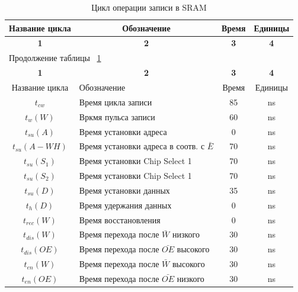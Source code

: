 \begin{center}
\begin{longtable}{|c|p{7cm}|c|c|}
\caption{Цикл операции записи в SRAM} \label{tab:sram_write_cycle} \\ \hline
\multicolumn{1}{|p{3cm}|}{\textbf{Название цикла}}    &   \multicolumn{1}{c|}{\textbf{Обозначение}} & 
\multicolumn{1}{|c|}{\textbf{Время}}    &   \multicolumn{1}{c|}{\textbf{Единицы}} \\ \hline

\multicolumn{1}{|c|}{\textbf{1}}    &   \multicolumn{1}{|c|}{\textbf{2}} &
\multicolumn{1}{|c|}{\textbf{3}}    &   \multicolumn{1}{|c|}{\textbf{4}} \\ \hline
\endfirsthead

\multicolumn{4}{l}{{Продолжение таблицы ~\ref{tab:sram_write_cycle}}} \\ %
\hline
\multicolumn{1}{|c|}{\textbf{1}}    &   \multicolumn{1}{|c|}{\textbf{2}} &
\multicolumn{1}{|c|}{\textbf{3}}    &   \multicolumn{1}{|c|}{\textbf{4}} \\ \hline
\endhead
\endfoot

	\hline
		Название цикла & Обозначение & Время & Единицы \\
	\hline
		${t_{cw}}$ & Время цикла записи & 85 & ns \\
	\hline
		${t_w(W)}$ & Вркмя пульса записи & 60 & ns \\
	\hline
		${t_{su}(A)}$ & Время установки адреса & 0 & ns \\
	\hline
		${t_{su}(A-WH)}$ & Время установки адреса в соотв. с $\bar{E}$ & 70 & ns \\
	\hline
		${t_{su}(S_1)}$ & Время установки Chip Select 1 & 70 & ns \\
	\hline
		${t_{su}(S_2)}$ & Время установки Chip Select 1 & 70 & ns \\
	\hline
		${t_{su}(D)}$ & Время установки данных & 35 & ns \\
	\hline
		${t_{h}(D)}$ & Время удержания данных & 0 & ns \\
	\hline
		${t_{rec}(W)}$ & Время восстановления & 0 & ns \\
	\hline
		${t_{dis}(W)}$ & Время перехода после $\bar{W}$ низкого & 30 & ns \\
	\hline
		${t_{dis}(OE)}$ & Время перехода после $\bar{OE}$ высокого & 30 & ns \\
	\hline
		${t_{en}(W)}$ & Время перехода после $\bar{W}$ высокого & 30 & ns \\
	\hline
		${t_{en}(OE)}$ & Время перехода после $\bar{OE}$ низкого & 30 & ns \\
	\hline
\end{longtable}
\end{center}

